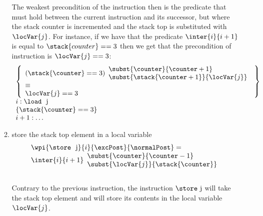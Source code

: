 \begin{itemize}
\begin{enumerate}
                The weakest precondition of the instruction then is the predicate that must hold between the current instruction
                and its successor, but where the stack counter is incremented and the stack top is substituted with $\locVar{j}$.
                For instance, if we have that the predicate $\inter{i}{i+1} $ is equal to $ \stack{counter} == 3$ then we get that the precondition of
                instruction is $\locVar{j} == 3$:               
		$$
		\begin{array}{l}
		    \left\{ \begin{array}{l} (\stack{\counter} == 3)\begin{array}{l} 
                                              \subst{\counter}{\counter +1} \\
					      \subst{  \stack{ \counter  + 1}}{\locVar{j}} 
					\end{array} \\
		                     \equiv\\
				     \locVar{j} == 3
		      \end{array}\right\} \\
		     i:  \load  \ \mbox{ \rm j} \\
                     \{ \stack{\counter} == 3 \} \\
                     i+1: \ldots 
		 \end{array}
		$$
 		
		\item store the stack top element in a local variable	 \\	 
		$$ \begin{array}{l}
                          \wpi{\store \ \mbox{ \rm j} } {i} {\excPost}{\normalPost}  =   \\ 
		\inter{i}{i+1}\begin{array}{l} 
                                    \subst{\counter}{\counter   - 1} \\
				    \subst{\locVar{j} }{\stack{ \counter}}  
			       \end{array}
                   \end{array} $$ \\
		  
		  Contrary to the previous instruction, the instruction $\store \ \mbox{\rm j}$ will take the stack top element
		  and will store its contents in the local variable $\locVar{j}$.


\end{enumerate}
\end{itemize}
